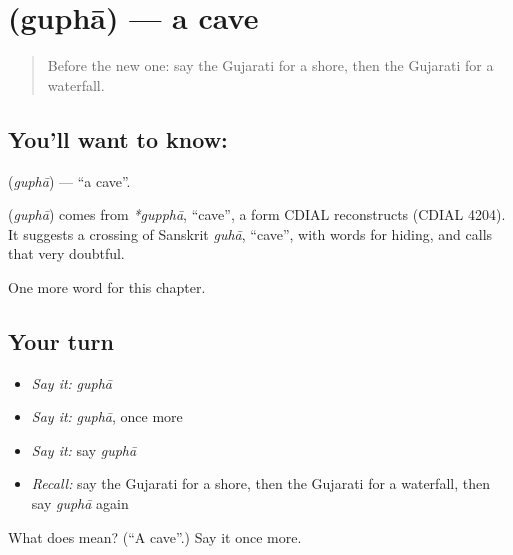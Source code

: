 \section[\texorpdfstring{\gu{ગુફા} (guphā)}{ગુફા (guphā)}]{ (guphā) — a cave}

\label{lesson:GU-C119-gupha}



\begin{quote}
Before the new one: say the Gujarati for a shore, then the Gujarati for a waterfall.
\end{quote}

\subsection*{You'll want to know: }
\textbf{} (\emph{guphā}) — \textquotedblleft{}a cave\textquotedblright{}.

\begin{cousinweb}
\textbf{} (\emph{guphā}) comes from \emph{*gupphā}, \textquotedblleft{}cave\textquotedblright{}, a form CDIAL reconstructs (CDIAL 4204). It suggests a crossing of Sanskrit \emph{guhā}, \textquotedblleft{}cave\textquotedblright{}, with words for hiding, and calls that very doubtful.
\end{cousinweb}

\begin{grammarlens}[title={What you've built}]
One more word for this chapter.
\end{grammarlens}

\subsection*{Your turn}
\begin{itemize}
\raggedright
  \item \emph{Say it:} \emph{guphā}
  \item \emph{Say it:} \emph{guphā}, once more
  \item \emph{Say it:} say \emph{guphā}
  \item \emph{Recall:} say the Gujarati for a shore, then the Gujarati for a waterfall, then say \emph{guphā} again
\end{itemize}

\begin{tcolorbox}[breakable,colback=teal!4,colframe=teal!35!black,title={Before you move on}]
What does  mean? (\textquotedblleft{}A cave\textquotedblright{}.) Say it once more.
\end{tcolorbox}
